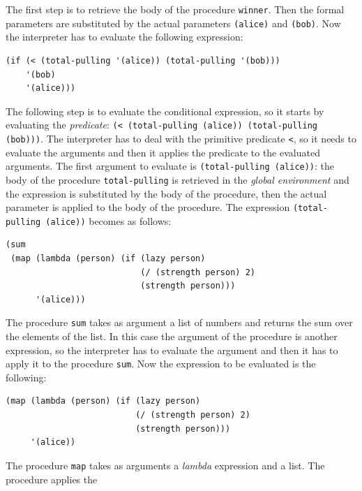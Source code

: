 \begin{itemize}
        The first step is to retrieve the body of the procedure \texttt{winner}. Then the formal parameters are substituted by 
        the actual parameters \texttt{\textquotesingle(alice)} and \texttt{\textquotesingle(bob)}. 
        Now the interpreter has to evaluate the following expression:
        \begin{lstlisting}[caption={Body of procedure \texttt{winner} with actual parameters}, captionpos=b]
(if (< (total-pulling '(alice)) (total-pulling '(bob)))
    '(bob)
    '(alice)))  
        \end{lstlisting}
        The following step is to evaluate the conditional expression, so it starts by evaluating the \textit{predicate}: 
        \texttt{(< (total-pulling \textquotesingle(alice)) (total-pulling \textquotesingle(bob)))}. The interpreter has to deal with the primitive predicate
        \texttt{<}, so it needs to evaluate the arguments and then it applies the predicate to the evaluated arguments.
        The first argument to evaluate is \texttt{(total-pulling \textquotesingle(alice))}: the body of the procedure \texttt{total-pulling} 
        is retrieved in the \textit{global environment} and the expression is substituted by the body of the procedure, 
        then the actual parameter is applied to the body of the procedure. The expression \texttt{(total-pulling \textquotesingle(alice))} becomes
        as follows:
        \begin{lstlisting}[caption={Body of procedure \texttt{total-pulling} with actual parameters}, captionpos=b, label={lst:t-p}]
(sum
 (map (lambda (person) (if (lazy person)
                           (/ (strength person) 2)
                           (strength person)))
      '(alice)))
        \end{lstlisting}
        The procedure \texttt{sum} takes as argument a list of numbers and returns the sum over the elements of the list. In this case
        the argument of the procedure is another expression, so the interpreter has to evaluate the argument and then it has to apply
        it to the procedure \texttt{sum}.
        Now the expression to be evaluated is the following:
        \begin{lstlisting}[caption={Argument of procedure \texttt{sum} in Listing~\ref{lst:t-p}}, captionpos=b, label={lst:map}]
(map (lambda (person) (if (lazy person)
                          (/ (strength person) 2)
                          (strength person)))
     '(alice))
        \end{lstlisting}
        The procedure \texttt{map} takes as arguments a \textit{lambda} expression and a list. The procedure applies the

\end{itemize}
